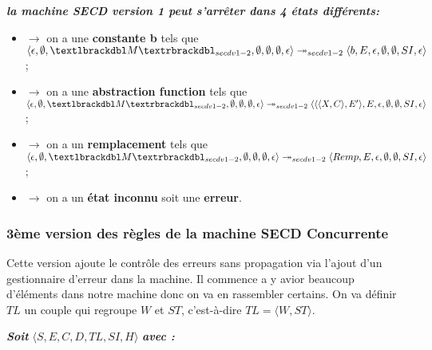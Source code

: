 \documentclass[10pt,a4paper]{article}
\begin{document}
				
				\textbf{\textit{la machine SECD version 1 peut s'arrêter dans 4 états différents:}}
				\smallbreak
				\begin{itemize}
					\item[]$\longrightarrow$ on a une \textbf{constante b} tels que $\langle \epsilon,\emptyset,\textlbrackdbl M\textrbrackdbl_{secdv1-2},\emptyset,\emptyset,\emptyset,\epsilon\rangle \twoheadrightarrow_{secdv1-2} \langle b,E,\epsilon,\emptyset,\emptyset,SI,\epsilon\rangle$;
					\item[]$\longrightarrow$ on a une \textbf{abstraction function} tels que $\langle \epsilon,\emptyset,\textlbrackdbl M\textrbrackdbl_{secdv1-2},\emptyset,\emptyset,\emptyset,\epsilon\rangle \twoheadrightarrow_{secdv1-2} \langle\langle\langle X,C\rangle,E'\rangle,E,\epsilon,\emptyset,\emptyset,SI,\epsilon\rangle$;
					\item[]$\longrightarrow$ on a un \textbf{remplacement} tels que $\langle \epsilon,\emptyset,\textlbrackdbl M\textrbrackdbl_{secdv1-2},\emptyset,\emptyset,\emptyset,\epsilon\rangle \twoheadrightarrow_{secdv1-2} \langle Remp,E,\epsilon,\emptyset,\emptyset,SI,\epsilon\rangle$;
					\item[]$\longrightarrow$ on a un \textbf{état inconnu} soit une \textbf{erreur}.
				\end{itemize}
				\newpage
				
				
			\subsubsection{3ème version des règles de la machine SECD Concurrente}\label{SECDConc3}
				\smallbreak
				Cette version ajoute le contrôle des erreurs sans propagation via l'ajout d'un gestionnaire d'erreur dans la machine. Il commence a y avior beaucoup d'éléments dans notre machine donc on va en rassembler certains. On va définir $TL$ un couple qui regroupe $W$ et $ST$, c'est-à-dire $TL = \langle W,ST\rangle$.
				\bigbreak
					
				\textbf{\textit{Soit}} $\langle S,E,C,D,TL,SI,H\rangle$ \textbf{\textit{avec :}}
			
\end{document}
